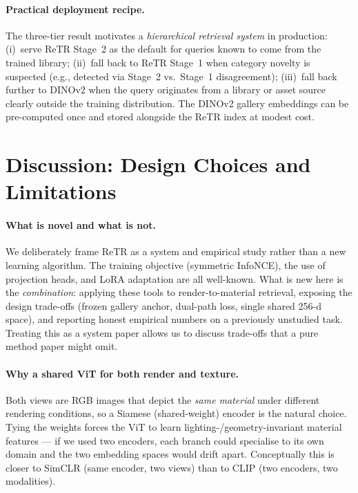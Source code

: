 \documentclass[10pt,twocolumn]{article}
\begin{document}
\paragraph{Practical deployment recipe.}
The three-tier result motivates a \emph{hierarchical retrieval system} in
production:
(i)~serve ReTR Stage~2 as the default for queries known to come from the
trained library;
(ii)~fall back to ReTR Stage~1 when category novelty is suspected (e.g.,
detected via Stage~2 vs.\ Stage~1 disagreement);
(iii)~fall back further to DINOv2 when the query originates from a library
or asset source clearly outside the training distribution.
The DINOv2 gallery embeddings can be pre-computed once and stored alongside
the ReTR index at modest cost.

\section{Discussion: Design Choices and Limitations}

\paragraph{What is novel and what is not.}
We deliberately frame ReTR as a system and empirical study rather than a new
learning algorithm.
The training objective (symmetric InfoNCE), the use of projection heads, and
LoRA adaptation are all well-known.
What is new here is the \emph{combination}: applying these tools to
render-to-material retrieval, exposing the design trade-offs (frozen
gallery anchor, dual-path loss, single shared 256-d space), and reporting
honest empirical numbers on a previously unstudied task.
Treating this as a system paper allows us to discuss
trade-offs that a pure method paper might omit.

\paragraph{Why a shared ViT for both render and texture.}
Both views are RGB images that depict the \emph{same material} under
different rendering conditions, so a Siamese (shared-weight) encoder is the
natural choice.
Tying the weights forces the ViT to learn lighting-/geometry-invariant
material features --- if we used two encoders, each branch could specialise
to its own domain and the two embedding spaces would drift apart.
Conceptually this is closer to SimCLR (same encoder, two views) than to CLIP
(two encoders, two modalities).
\end{document}
